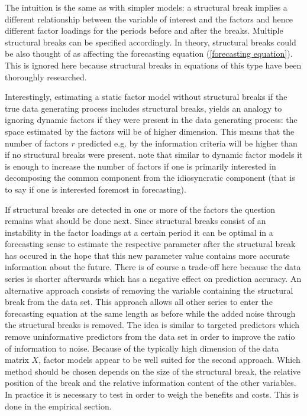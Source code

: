 \documentclass[12pt]{article}
\begin{document}
The intuition is the same as with simpler models: a structural break implies a different relationship between the variable of interest and the factors and hence different factor loadings for the periods before and after the breaks. Multiple structural breaks can be specified accordingly. In theory, structural breaks could be also thought of as affecting the forecasting equation (\ref{forecasting equation}). This is ignored here because structural breaks in equations of this type have been thoroughly researched.


Interestingly, estimating a static factor model without structural breaks if the true data generating process includes structural breaks, yields an analogy to ignoring dynamic factors if they were present in the data generating process: the space estimated by the factors will be of higher dimension. This means that the number of factors $r$ predicted e.g. by the \citet{bai2002determining} information criteria will be higher than if no structural breaks were present. \citet{breitung2011testing} note that similar to dynamic factor models it is enough to increase the number of factors if one is primarily interested in decomposing the common component from the idiosyncratic component (that is to say if one is interested foremost in forecasting).

If structural breaks are detected in one or more of the factors the question remains what should be done next. Since structural breaks consist of an instability in the factor loadings at a certain period it can be optimal in a forecasting sense to estimate the respective parameter after the structural break has occured in the hope that this new parameter value contains more accurate information about the future. There is of course a trade-off here because the data series is shorter afterwards which has a negative effect on prediction accuracy.
An alternative approach consists of removing the variable containing the structural break from the data set. This approach allows all other series to enter the forecasting equation at the same length as before while the added noise through the structural breaks is removed. The idea is similar to targeted predictors which remove uninformative predictors from the data set in order to improve the ratio of information to noise. Because of the typically high dimension of the data matrix $X$, factor models appear to be well suited for the second approach. Which method should be chosen depends on the size of the structural break, the relative position of the break and the relative information content of the other variables. In practice it is necessary to test in order to weigh the benefits and costs. This is done in the empirical section.
\end{document}
